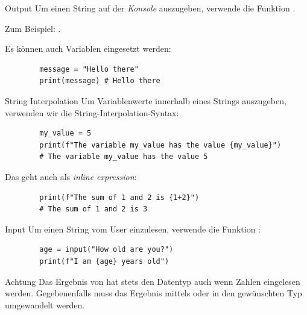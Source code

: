 \begin{fragile}[]
	
	\begin{block}{Output}
		\vspace{2pt}
		Um einen String auf der \emph{Konsole} auszugeben, verwende die Funktion . 
		
		
		Zum Beispiel: . 
		\pause
		
		\vspace{12pt}
		
		Es können auch Variablen eingesetzt werden: 
		\begin{verbatim}
		message = "Hello there"
		print(message) # Hello there
		\end{verbatim}
		
	\end{block}
	
\end{fragile}

\begin{fragile}[]
	
	\begin{block}{String Interpolation}
		\vspace{2pt}
		Um Variablenwerte innerhalb eines Strings auszugeben, verwenden wir die String-Interpolation-Syntax:
		\begin{verbatim}
		my_value = 5
		print(f"The variable my_value has the value {my_value}")
		# The variable my_value has the value 5
		\end{verbatim}
		
		\pause
		
		\vspace{12pt}
		
		Das geht auch als \textit{inline expression}: 
		\begin{verbatim}
		print(f"The sum of 1 and 2 is {1+2}")
		# The sum of 1 and 2 is 3
		\end{verbatim}
		
	\end{block}
	
\end{fragile}

\begin{fragile}
	\begin{block}{Input}
		\vspace{2pt}
		Um einen String vom User einzulesen, verwende die Funktion :
		
		\begin{verbatim}
		age = input("How old are you?")
		print(f"I am {age} years old")
		\end{verbatim}
	\end{block}
	\pause 
	\begin{alertblock}{Achtung}
		\vspace{2pt}
		Das Ergebnis von  hat stets den Datentyp  auch wenn Zahlen eingelesen werden. Gegebenenfalls muss das Ergebnis mittels  oder  in den gewünschten Typ umgewandelt werden. 	
	\end{alertblock}
	
\end{fragile}


